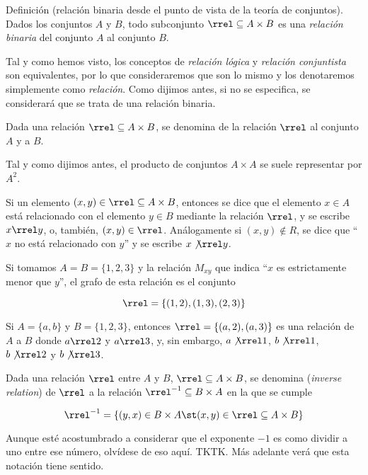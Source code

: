 Definición (relación binaria desde el punto de vista de la teoría de
conjuntos). Dados los conjuntos $A$ y $B$, todo subconjunto $\rrel \subseteq
A \times B$ es una \emph{relación binaria} del conjunto $A$ al conjunto $B$.

Tal y como hemos visto, los conceptos de \emph{relación lógica} y
\emph{relación conjuntista} son equivalentes, por lo que consideraremos que
son lo mismo y los denotaremos simplemente como \emph{relación}. Como
dijimos antes, si no se especifica, se considerará que se trata de una
relación binaria.

Dada una relación $\rrel \subseteq A \times B$, se denomina  de la relación $\rrel$ al conjunto $A$ y  a
$B$.

Tal y como dijimos antes, el producto de conjuntos $A \times A$ se suele
representar por $A^2$.

Si un elemento $(x, y) \in \rrel \subseteq A \times B$, entonces se dice que
el elemento $x \in A$ está relacionado con el elemento $y \in B$ mediante la
relación $\rrel$, y se escribe $x \rrel y$, o, también, $(x, y) \in \rrel$.
Análogamente si $(x, y) \notin R$, se dice que ``$x$ no está relacionado con
$y$'' y se escribe $x \not\rrel y$.

\begin{example}
  Si tomamos $A = B = \{1, 2, 3\}$ y la relación $M_{xy}$ que indica ``$x$
  es estrictamente menor que $y$'', el grafo de esta relación es el conjunto

  \[ \rrel = \{(1, 2), (1, 3), (2, 3)\} \]

  Si $A = \{a, b\}$ y $B = \{1, 2, 3\}$, entonces $\rrel = \{(a, 2), (a,
  3)\}$ es una relación de $A$ a $B$ donde $a \rrel 2$ y $a \rrel 3$, y, sin
  embargo, $a \not\rrel 1$, $b \not\rrel 1$, $b \not\rrel 2$ y $b \not\rrel
  3$.
\end{example}

Dada una relación $\rrel$ entre $A$ y $B$, $\rrel \subseteq A \times B$, se
denomina  (\emph{inverse relation}) de $\rrel$ a la
relación $\rrel^{-1} \subseteq B \times A$ en la que se cumple

\[ \rrel^{-1} = \{(y, x) \in B \times A \st (x, y) \in \rrel \subseteq A
\times B \} \]

\noindent Aunque esté acostumbrado a considerar que el exponente ${-1}$ es
como dividir a uno entre ese número, olvídese de eso aquí. TKTK. Más
adelante verá que esta notación tiene sentido.

